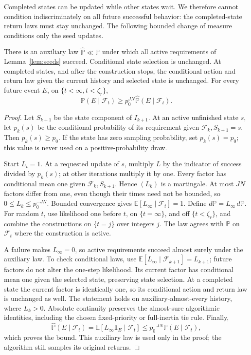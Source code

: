 Completed states can be updated while other states wait. We therefore cannot condition
indiscriminately on all future successful behavior: the completed-state return laws must stay
unchanged. The following bounded change of measure conditions only the seed updates.

\begin{lemma}\label{lem:measure}
There is an auxiliary law $\widehat{\mathbb P}\ll\mathbb P$
under which all active requirements of Lemma~\ref{lem:seeds} succeed. Conditional state selection is
unchanged. At completed states, and after the construction stops, the conditional action and
return law given the current history and selected state is unchanged. For every future event
$E$, on $\{t<\infty,t<\zeta_r\}$,
\begin{equation}\label{eq:transfer}
\mathbb P(E\mid\mathcal F_t)\ge p_0^{JN}\widehat{\mathbb P}(E\mid\mathcal F_t).
\end{equation}
\end{lemma}
\begin{proof}
Let $S_{k+1}$ be the state component of $I_{k+1}$. At an active unfinished state $s$, let
$p_k(s)$ be the conditional probability of its requirement given $\mathcal F_k,S_{k+1}=s$. Then $p_k(s)\ge p_0$.
If the state has zero sampling probability, set $p_k(s)=p_0$; this value is never used on a
positive-probability draw.

Start $L_t=1$. At a requested update of $s$, multiply $L$ by the indicator of success divided
by $p_k(s)$; at other iterations multiply it by one. Every factor has conditional mean one given
$\mathcal F_k,S_{k+1}$. Hence $(L_k)$ is a martingale. At most $JN$ factors differ from one, even though their
times need not be bounded, so $0\le L_k\le p_0^{-JN}$. Bounded convergence gives $\mathbb E[L_\infty\mid\mathcal F_t]=1$.
Define $d\widehat{\mathbb P}=L_\infty\,d\mathbb P$. For random $t$, use likelihood one before $t$, on $\{t=\infty\}$, and off $\{t<\zeta_r\}$,
and combine the constructions on $\{t=j\}$ over integers $j$. The law agrees with $\mathbb P$ on $\mathcal F_t$
where the construction is active.

A failure makes $L_\infty=0$, so active requirements succeed almost surely under the auxiliary
law. To check conditional laws, use $\mathbb E[L_\infty\mid\mathcal F_{k+1}]=L_{k+1}$; future factors do not alter
the one-step likelihood. Its current factor has conditional mean one given the selected
state, preserving state selection. At a completed state the current factor is identically one,
so its conditional action and return law is unchanged as well. The statement holds on
auxiliary-almost-every history, where $L_k>0$. Absolute continuity preserves the almost-sure
algorithmic identities, including the chosen fixed-priority or full-inertia tie rule. Finally,
\[
\widehat{\mathbb P}(E\mid\mathcal F_t)=\mathbb E[L_\infty\mathbf1_E\mid\mathcal F_t]
\le p_0^{-JN}\mathbb P(E\mid\mathcal F_t),
\]
which proves the bound. This auxiliary law is used only in the proof; the algorithm still
samples its original returns.
\end{proof}


